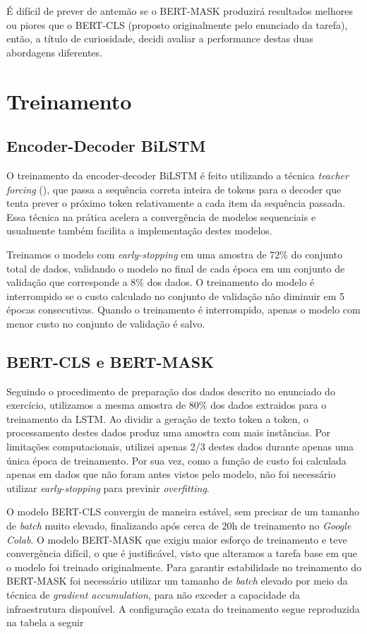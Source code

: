 \documentclass{article}
\begin{document}
É difícil de prever de antemão se o BERT-MASK produzirá resultados melhores ou piores que o BERT-CLS (proposto originalmente pelo enunciado da tarefa), então, a título de curiosidade, decidi avaliar a performance destas duas abordagens diferentes.

\section{Treinamento}

\subsection{Encoder-Decoder BiLSTM}

O treinamento da encoder-decoder BiLSTM é feito utilizando a técnica \textit{teacher forcing} (\textcite{williams1989learning}), que passa a sequência correta inteira de tokens para o decoder que tenta prever o próximo token relativamente a cada item da sequência passada. Essa técnica na prática acelera a convergência de modelos sequenciais e usualmente também facilita a implementação destes modelos.

Treinamos o modelo com \textit{early-stopping} em uma amostra de 72\% do conjunto total de dados, validando o modelo no final de cada época em um conjunto de validação que corresponde a 8\% dos dados. O treinamento do modelo é interrompido se o custo calculado no conjunto de validação não diminuir em 5 épocas consecutivas. Quando o treinamento é interrompido, apenas o modelo com menor custo no conjunto de validação é salvo.

\subsection{BERT-CLS e BERT-MASK}

Seguindo o procedimento de preparação dos dados descrito no enunciado do exercício, utilizamos a mesma amostra de 80\% dos dados extraidos para o treinamento da LSTM. Ao dividir a geração de texto token a token, o processamento destes dados produz uma amostra com mais instâncias. Por limitações computacionais, utilizei apenas 2/3 destes dados durante apenas uma única época de treinamento. Por sua vez, como a função de custo foi calculada apenas em dados que não foram antes vistos pelo modelo, não foi necessário utilizar \textit{early-stopping} para previnir \textit{overfitting}.

O modelo BERT-CLS convergiu de maneira estável, sem precisar de um tamanho de \textit{batch} muito elevado, finalizando após cerca de 20h de treinamento no \textit{Google Colab}. O modelo BERT-MASK que exigiu maior esforço de treinamento e teve convergência difícil, o que é justificável, visto que alteramos a tarefa base em que o modelo foi treinado originalmente. Para garantir estabilidade no treinamento do BERT-MASK foi necessário utilizar um tamanho de \textit{batch} elevado por meio da técnica de \textit{gradient accumulation}, para não exceder a capacidade da infraestrutura disponível. A configuração exata do treinamento segue reproduzida na tabela a seguir
\end{document}
